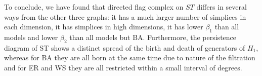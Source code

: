 To conclude, we have found that directed flag complex on $ST$ differs in several ways from the other three graphs: it has a much larger number of simplices in each dimension, it has simplices in high dimensions, it has lower $\beta_{1}$ than all models and lower $\beta_{2}$ than all models but BA. Furthermore, the persistence diagram of ST shows a distinct spread of the birth and death of generators of $H_{1}$, whereas for BA they are all born at the same time due to nature of the filtration and for ER and WS they are all restricted within a small interval of degrees.
